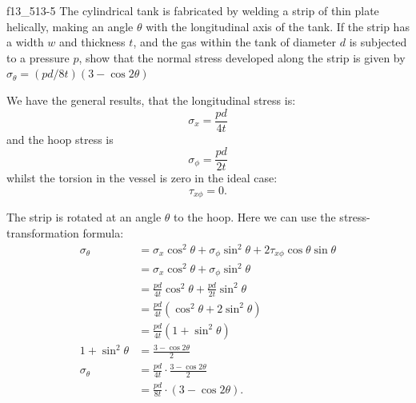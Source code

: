 
\begin{problemwithimage}{f13_5}{13-5}
  The cylindrical tank is fabricated by welding a strip of thin plate helically, making an angle $\theta$ with the longitudinal axis of the tank.
  If the strip has a width $w$ and thickness $t$, and the gas within the tank of diameter $d$ is subjected to a pressure $p$, show that the normal stress developed along the strip is given by $\sigma_{\theta} = \left( p d / 8 t\right) \left( 3 - \cos 2\theta \right)$
\end{problemwithimage}

\begin{derivation}
  We have the general results, that the longitudinal stress is:
  \begin{equation*}
    \sigma_x = \frac{p d}{4t}
  \end{equation*}
  and the hoop stress is
  \begin{equation*}
    \sigma_{\phi} = \frac{p d}{2t}
  \end{equation*}
  whilst the torsion in the vessel is zero in the ideal case:
  \begin{equation*}
    \tau_{x\phi} = 0
  .\end{equation*}
  
  The strip is rotated at an angle $\theta$ to the hoop.
  Here we can use the stress-transformation formula:
  \begin{align*}
    \sigma_{\theta} &= \sigma_x \cos^2 \theta + \sigma_{\phi} \sin^2 \theta + 2 \tau_{x \phi} \cos \theta \sin \theta \\
    &= \sigma_x \cos^2 \theta + \sigma_{\phi} \sin^2\theta \\
    &= \frac{p d}{4t} \cos^2 \theta + \frac{p d}{2t} \sin^2 \theta \\
    &= \frac{p d}{4t} \left( \cos^2 \theta + 2 \sin^2 \theta \right) \\
    &= \frac{p d}{4t} \left( 1 + \sin^2 \theta \right) \\
    1 + \sin^2 \theta &= \frac{3 - \cos 2\theta}{2} \\
    \sigma_{\theta} &= \frac{p d}{4t} \cdot \frac{3 - \cos 2\theta}{2} \\
    &= \frac{p d}{8t} \cdot \left( 3 - \cos 2\theta \right)
  .\end{align*}
\end{derivation}



